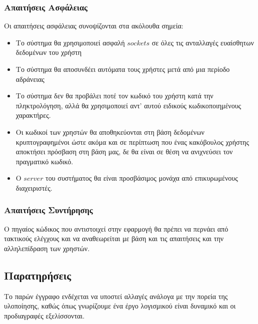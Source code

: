 \documentclass[12pt]{article}
\begin{document}
\subsubsection{Απαιτήσεις Ασφάλειας}

Οι απαιτήσεις ασφάλειας συνοψίζονται στα ακόλουθα σημεία:

\begin{itemize}
\item Το σύστημα θα χρησιμοποιεί ασφαλή $sockets$ σε όλες τις ανταλλαγές ευαίσθητων δεδομένων του χρήστη
\item Το σύστημα θα αποσυνδέει αυτόματα τους χρήστες μετά από μια περίοδο αδράνειας

\item Το σύστημα δεν θα προβάλει ποτέ τον κωδικό του χρήστη κατά την πληκτρολόγηση, αλλά θα χρησιμοποιεί αντ' αυτού ειδικούς κωδικοποιημένους χαρακτήρες.
\item Οι κωδικοί των χρηστών θα αποθηκεύονται στη βάση δεδομένων κρυπτογραφημένοι ώστε ακόμα και σε περίπτωση που ένας κακόβουλος χρήστης αποκτήσει πρόσβαση στη βάση μας, δε θα είναι σε θέση να ανιχνεύσει τον πραγματικό κωδικό.
\item Ο $server$ του συστήματος θα είναι προσβάσιμος μονάχα από επικυρωμένους διαχειριστές.
\end{itemize}

\subsubsection{Απαιτήσεις Συντήρησης}

Ο πηγαίος κώδικος που αντιστοιχεί στην εφαρμογή θα πρέπει να περνάει από τακτικούς ελέγχους και να αναθεωρείται με βάση και τις απαιτήσεις και την αλληλεπίδραση των χρηστών.

\subsection{Παρατηρήσεις}

Το παρών έγγραφο ενδέχεται να υποστεί αλλαγές ανάλογα με την πορεία της υλοποίησης, καθώς όπως γνωρίζουμε ένα έργο λογισμικού είναι δυναμικό και οι προδιαγραφές εξελίσσονται.
\end{document}
